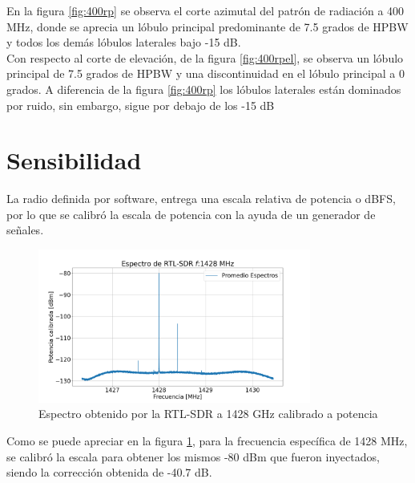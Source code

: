 En la figura \ref{fig:400rp} se observa el corte azimutal del patrón de radiación a 400 MHz, donde se aprecia un lóbulo principal predominante de 7.5 grados de HPBW y todos los demás lóbulos laterales bajo -15 dB.\\


Con respecto al corte de elevación, de la figura \ref{fig:400rpel}, se observa un lóbulo principal de 7.5 grados de HPBW y una discontinuidad en el lóbulo principal a 0 grados. A diferencia de la figura \ref{fig:400rp} los lóbulos laterales están dominados por ruido, sin embargo, sigue por debajo de los -15 dB\\



\section{Sensibilidad}

La radio definida por software, entrega una escala relativa de potencia o dBFS, por lo que se calibró la escala de potencia con la ayuda de un generador de señales.\\

\begin{figure}
    \centering
    \includegraphics[width=0.8\textwidth]{img/rtl1428}
    \caption{Espectro obtenido por la RTL-SDR a 1428 GHz calibrado a potencia}
    \label{fig:rtl1428}
\end{figure}

Como se puede apreciar en la figura \ref{fig:rtl1428}, para la frecuencia específica de 1428 MHz, se calibró la escala para obtener los mismos -80 dBm que fueron inyectados, siendo la corrección obtenida de -40.7 dB.\\

